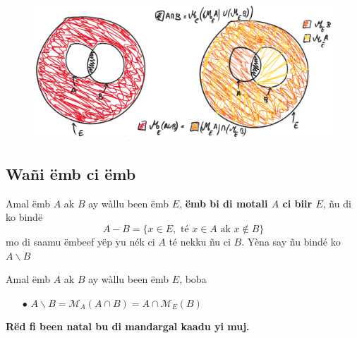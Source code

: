 \documentclass[twoside, a4paper]{article}
\begin{document}
\begin{figure}[ht]
    \centering
    \includegraphics[scale = 0.5]{image/motali_emb_teg.png}
    \label{fig:motali_emb_teg}
\end{figure}

\subsection{Wañi ëmb ci ëmb}
\begin{tcolorbox}[enhanced jigsaw,breakable,pad at break*=1mm, colback=red!5!white,colframe=white!75!black,title= Téeki,watermark color=white]
Amal ëmb $A$ ak $B$ ay wàllu been ëmb $E$, \textbf{ëmb bi di motali $A$ ci biir $E$}, ñu di ko bindë $$A - B = \big \{x \in E, \text{ té } x \in A \text{ ak } x \not \in B\}$$
mo di saamu ëmbeef yëp yu nék ci $A$ té nekku ñu ci $B$. Yèna say ñu bindé ko $A \backslash B$ 
\end{tcolorbox}

\begin{tcolorbox}[enhanced jigsaw,breakable,pad at break*=1mm, colback=orange!5!white,colframe=white!75!black,title= Seetlu,
  watermark color=white]
Amal ëmb $A$ ak $B$ ay wàllu been ëmb $E$, boba

\begin{itemize}
    \item[$\bullet$] $A\backslash B = \mathcal{M}_A (A\cap B) = A \cap \mathcal{M}_E (B)$
\end{itemize}
\end{tcolorbox}
\textbf{Rëd fi been natal bu di mandargal kaadu yi muj.}
\end{document}
